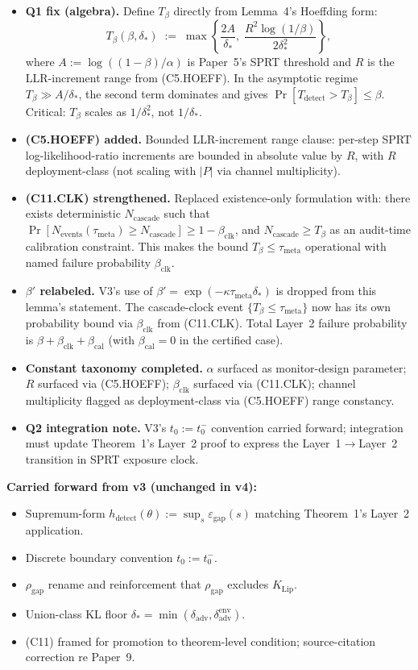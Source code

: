 \documentclass{article}
\newcommand{\deltaadv}{\delta_{\mathrm{adv}}}
\newcommand{\deltastar}{\delta_{*}}
\newcommand{\rhogap}{\rho_{\mathrm{gap}}}
\newcommand{\epsgap}{\varepsilon_{\mathrm{gap}}}
\newcommand{\Tbeta}{T_{\beta}}
\newcommand{\Ncasc}{N_{\mathrm{cascade}}}
\newcommand{\Nev}{N_{\mathrm{events}}}
\newcommand{\bclk}{\beta_{\mathrm{clk}}}
\newcommand{\bcal}{\beta_{\mathrm{cal}}}
\begin{document}
\begin{itemize}
\item \textbf{Q1 fix (algebra).}  Define $\Tbeta$ directly from
  Lemma~4's Hoeffding form:
  \[
    \Tbeta(\beta, \deltastar) \;:=\;
    \max\!\left\{\frac{2A}{\deltastar},\;
    \frac{R^2 \log(1/\beta)}{2 \deltastar^2}\right\},
  \]
  where $A := \log((1-\beta)/\alpha)$ is Paper~5's SPRT threshold
  and $R$ is the LLR-increment range from (C5.HOEFF).  In the
  asymptotic regime $\Tbeta \gg A/\deltastar$, the second term
  dominates and gives $\Pr[T_{\mathrm{detect}} > \Tbeta] \leq
  \beta$.  Critical: $\Tbeta$ scales as $1/\deltastar^2$, not
  $1/\deltastar$.
\item \textbf{(C5.HOEFF) added.}  Bounded LLR-increment range
  clause: per-step SPRT log-likelihood-ratio increments are bounded
  in absolute value by $R$, with $R$ deployment-class (not scaling
  with $|P|$ via channel multiplicity).
\item \textbf{(C11.CLK) strengthened.}  Replaced existence-only
  formulation with: there exists deterministic $\Ncasc$ such that
  $\Pr[\Nev(\tau_{\mathrm{meta}}) \geq \Ncasc] \geq 1 - \bclk$, and
  $\Ncasc \geq \Tbeta$ as an audit-time calibration constraint.
  This makes the bound $\Tbeta \leq \tau_{\mathrm{meta}}$
  operational with named failure probability $\bclk$.
\item \textbf{$\beta'$ relabeled.}  V3's use of $\beta' = \exp(-\kappa
  \tau_{\mathrm{meta}} \deltastar)$ is dropped from this lemma's
  statement.  The cascade-clock event $\{\Tbeta \leq
  \tau_{\mathrm{meta}}\}$ now has its own probability bound via
  $\bclk$ from (C11.CLK).  Total Layer~2 failure probability is
  $\beta + \bclk + \bcal$ (with $\bcal = 0$ in the certified case).
\item \textbf{Constant taxonomy completed.}  $\alpha$ surfaced as
  monitor-design parameter; $R$ surfaced via (C5.HOEFF); $\bclk$
  surfaced via (C11.CLK); channel multiplicity flagged as
  deployment-class via (C5.HOEFF) range constancy.
\item \textbf{Q2 integration note.}  V3's $t_0 := t_0^-$ convention
  carried forward; integration must update Theorem~1's Layer~2
  proof to express the Layer~1$\to$Layer~2 transition in SPRT
  exposure clock.
\end{itemize}

\textbf{Carried forward from v3 (unchanged in v4):}
\begin{itemize}
\item Supremum-form $h_{\mathrm{detect}}(\theta) := \sup_s
  \epsgap(s)$ matching Theorem~1's Layer~2 application.
\item Discrete boundary convention $t_0 := t_0^-$.
\item $\rhogap$ rename and reinforcement that $\rhogap$ excludes
  $K_{\mathrm{Lip}}$.
\item Union-class KL floor $\deltastar = \min(\deltaadv,
  \delta_{\mathrm{adv}}^{\mathrm{env}})$.
\item (C11) framed for promotion to theorem-level condition;
  source-citation correction re Paper~9.
\end{itemize}
\end{document}
